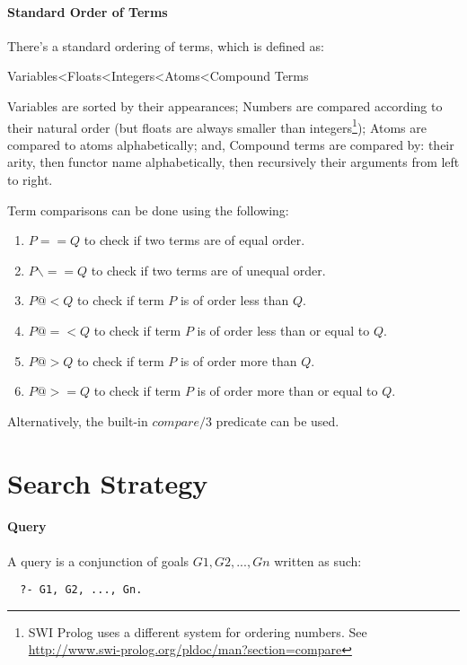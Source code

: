 \documentclass{article}
\begin{document}
\begin{multicols}{2}
  \paragraph{Standard Order of Terms} There's a standard ordering of terms, which is defined as:
  
  \noindent \small Variables\textless Floats\textless Integers\textless Atoms\textless Compound Terms
  
  Variables are sorted by their appearances; Numbers are compared according to their natural order (but floats are always smaller than integers\footnote{SWI Prolog uses a different system for ordering numbers. See \href{http://www.swi-prolog.org/pldoc/man?section=compare}{http://www.swi-prolog.org/pldoc/man?section=compare}}); Atoms are compared to atoms alphabetically; and, Compound terms are compared by: their arity, then functor name alphabetically, then recursively their arguments from left to right. 
  
  Term comparisons can be done using the following:
  
  \begin{enumerate}
  \item $P == Q$ to check if two terms are of equal order.
  \item $P \backslash== Q$ to check if two terms are of unequal order.
  \item $P @< Q$ to check if term $P$ is of order less than $Q$.
  \item $P @=< Q$ to check if term $P$ is of order less than or equal to $Q$.
  \item $P @> Q$ to check if term $P$ is of order more than $Q$.
  \item $P @>= Q$ to check if term $P$ is of order more than or equal to $Q$.
  \end{enumerate}
  
  Alternatively, the built-in $compare/3$ predicate can be used.
  
  \section{Search Strategy}
  
  \paragraph{Query} A query is a conjunction of goals $G1, G2, ..., Gn$ written as such:
  
  \begin{lstlisting}
  ?- G1, G2, ..., Gn.
  \end{lstlisting}
  

\end{multicols}
\end{document}
